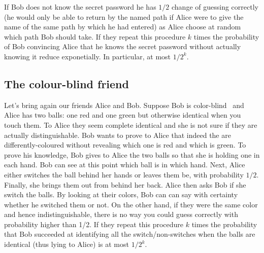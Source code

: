 If Bob does not know the secret password he has $1/2$ change of guessing correctly (he would only be able to return by the named path if
Alice were to give the name of the same path by which he had entered) as Alice choose at random which path Bob should take. If they repeat this procedure
$k$ times the probability of Bob convincing Alice that he knows the secret password without actually knowing it reduce exponetially. In particular, at most $1/2^{k}$.

\subsection{The colour-blind friend}

Let's bring again our friends Alice and Bob. Suppose Bob is color-blind~\cite{wiki:zkp,zkp:colour_blind} and Alice has two balls: one red and one green but otherwise identical when you touch them.
To Alice they seem complete identical and she is not sure if they are actually distinguishable. Bob wants to prove to Alice that indeed the are differently-coloured
without revealing which one is red and which is green. To prove his knowledge, Bob gives to Alice the two balls so that she is holding one in each hand. Bob can see
at this point which ball is in which hand. Next, Alice either switches the ball behind her hands or leaves them be, with probability $1/2$. Finally, she brings
them out from behind her back. Alice then asks Bob if she switch the balls. By looking at their colors, Bob can can say with certainty whether he switched them or not.
On the other hand, if they were the same color and hence indistinguishable, there is no way you could guess correctly with probability higher than 1/2. If they repeat
this procedure $k$ times the probability that Bob succeeded at identifying all the switch/non-switches when the balls are identical (thus lying to Alice) is at most
$1/2^{k}$.

